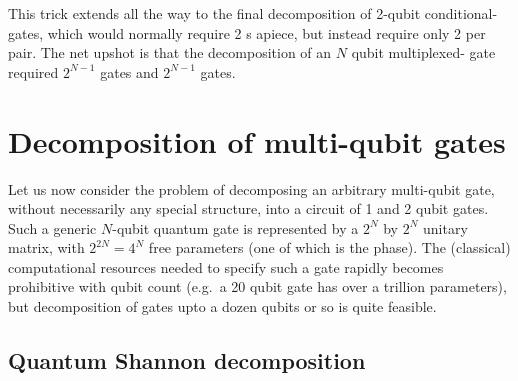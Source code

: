 This trick extends all the way to the final decomposition of 2-qubit conditional- gates, which would normally require 2 s apiece, but instead require only 2 per pair. The net upshot is that the decomposition of an $N$ qubit multiplexed- gate required $2^{N-1}$  gates and $2^{N-1}$  gates.









\clearpage
\section{Decomposition of multi-qubit gates}

Let us now consider the problem of decomposing an arbitrary multi-qubit gate, without necessarily any special structure, into a circuit of 1 and 2 qubit gates.  
Such a generic $N$-qubit quantum gate is represented by a $2^N$ by $2^N$ unitary matrix, with $2^{2N}=4^N$ free parameters (one of which is the phase).  The (classical) computational resources needed to specify such a gate rapidly becomes prohibitive with qubit count (e.g.~a 20 qubit gate has over a trillion parameters), but decomposition of gates upto a dozen qubits or so is quite feasible.
 




\subsection{Quantum Shannon decomposition}
\newcommand{\bigzero}{\mbox{\normalfont\Large 0}}


